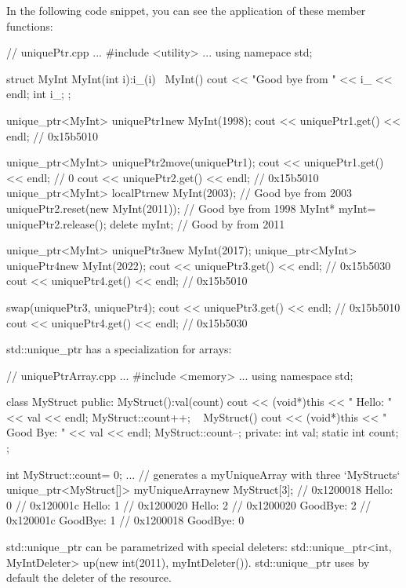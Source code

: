 In the following code snippet, you can see the application of these member functions:


\begin{cpp}
// uniquePtr.cpp
...
#include <utility>
...
using namepace std;

struct MyInt{
	MyInt(int i):i_(i){}
	~MyInt(){
		cout << "Good bye from " << i_ << endl;
	}
	int i_;
};

unique_ptr<MyInt> uniquePtr1{new MyInt(1998)};
cout << uniquePtr1.get() << endl; // 0x15b5010

unique_ptr<MyInt> uniquePtr2{move(uniquePtr1)};
cout << uniquePtr1.get() << endl; // 0
cout << uniquePtr2.get() << endl; // 0x15b5010
{
	unique_ptr<MyInt> localPtr{new MyInt(2003)};
} // Good bye from 2003
uniquePtr2.reset(new MyInt(2011)); // Good bye from 1998
MyInt* myInt= uniquePtr2.release();
delete myInt; // Good by from 2011

unique_ptr<MyInt> uniquePtr3{new MyInt(2017)};
unique_ptr<MyInt> uniquePtr4{new MyInt(2022)};
cout << uniquePtr3.get() << endl; // 0x15b5030
cout << uniquePtr4.get() << endl; // 0x15b5010

swap(uniquePtr3, uniquePtr4);
cout << uniquePtr3.get() << endl; // 0x15b5010
cout << uniquePtr4.get() << endl; // 0x15b5030
\end{cpp}

std::unique\_ptr has a specialization for arrays:


\begin{cpp}
// uniquePtrArray.cpp
...
#include <memory>
...
using namespace std;

class MyStruct{
	public:
	MyStruct():val(count){
		cout << (void*)this << " Hello: " << val << endl;
		MyStruct::count++;
	} ~
	MyStruct(){
		cout << (void*)this << " Good Bye: " << val << endl;
		MyStruct::count--;
	}
	private:
	int val;
	static int count;
};

int MyStruct::count= 0;
...
{
	// generates a myUniqueArray with three `MyStructs`
	unique_ptr<MyStruct[]> myUniqueArray{new MyStruct[3]};
}
// 0x1200018 Hello: 0
// 0x120001c Hello: 1
// 0x1200020 Hello: 2
// 0x1200020 GoodBye: 2
// 0x120001c GoodBye: 1
// 0x1200018 GoodBye: 0
\end{cpp}


std::unique\_ptr can be parametrized with special deleters: std::unique\_ptr<int, MyIntDeleter> up(new int(2011), myIntDeleter()). std::unique\_ptr uses by default the deleter of the resource.


